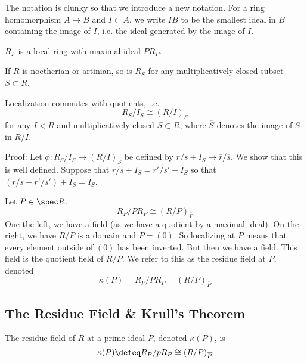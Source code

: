 \begin{rem}
The notation is clunky so that we introduce a new notation. For a ring homomorphism $A \to B$ and $I \subset A$, we write $IB$ to be the smallest ideal in $B$ containing the image of $I$, i.e. the ideal generated by the image of $I$.
\end{rem}

\begin{ex}
$R_P$ is a local ring with maximal ideal $PR_P$. 
\end{ex}

\begin{cor}
If $R$ is noetherian or artinian, so is $R_S$ for any multiplicatively closed subset $S \subset R$. 
\end{cor}

\begin{lem}
Localization commutes with quotients, i.e.
\[
R_S/I_S \cong (R/I)_{\overline{S}}
\]
for any $I \lhd R$ and multiplicatively closed $S \subset R$, where $\overline{S}$ denotes the image of $S$ in $R/I$. 
\end{lem}

\noindent Proof: Let $\phi: R_S/I_S \to (R/I)_{\overline{S}}$ be defined by $r/s+I_S \mapsto \overline{r}/\overline{s}$. We show that this is well defined. Suppose that $r/s+I_S=r'/s'+I_S$ so that $(r/s-r'/s')+I_S=I_S$. 





\newpage







\begin{ex}
Let $P \in \spec R$. 
\[
R_P/PR_P \cong (R/P)_{\overline{P}}
\]
One the left, we have a field (as we have a quotient by a maximal ideal). On the right, we have $R/P$ is a domain and $\overline{P}=(0)$. So localizing at $\overline{P}$ means that every element outside of $(0)$ has been inverted. But then we have a field. This field is the quotient field of $R/P$. We refer to this as the residue field at $P$, denoted
\[
\kappa(P)=R_P/PR_P=(R/P)_{\overline{P}}
\]
\end{ex}

\subsection{The Residue Field \& Krull's Theorem}

\begin{dfn}
The residue field of $R$ at a prime ideal $P$, denoted $\kappa(P)$, is 
\[
\kappa(P)\defeq R_P/pR_P \cong (R/P)_{\overline{P}}
\]
\end{dfn}

